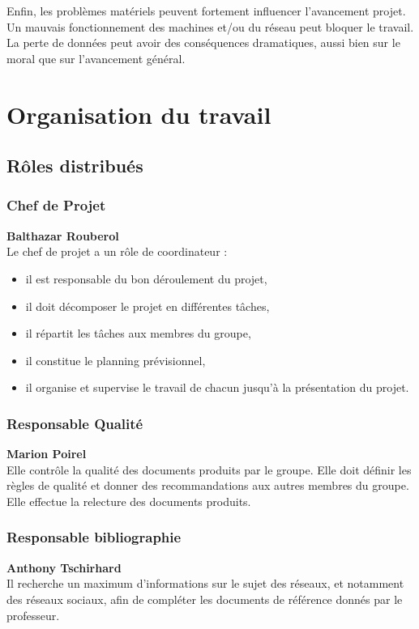 Enfin, les problèmes matériels peuvent fortement influencer l'avancement projet. Un mauvais fonctionnement des machines et/ou du réseau peut bloquer le travail. La perte de données peut avoir des conséquences dramatiques, aussi bien sur le moral que sur l'avancement général.

\section{Organisation du travail}
\subsection{Rôles distribués}

\subsubsection{Chef de Projet}
\textbf{Balthazar Rouberol}\\
Le chef de projet a un rôle de coordinateur :  
\begin{itemize}
\item il est responsable du bon déroulement du projet,
\item il doit décomposer le projet en différentes tâches,
\item il répartit les tâches aux membres du groupe,
\item il constitue le planning prévisionnel,
\item il organise et supervise le travail de chacun jusqu'à la présentation du projet.
\end{itemize}
  
\subsubsection{Responsable Qualité}
\textbf{Marion Poirel}\\
Elle contrôle la qualité des documents produits par le groupe. Elle doit définir les règles de qualité et donner des recommandations aux autres membres du groupe. Elle effectue la relecture des documents produits.

\subsubsection{Responsable bibliographie}
\textbf{Anthony Tschirhard}\\
Il recherche un maximum d'informations sur le sujet des réseaux, et notamment des réseaux sociaux, afin de compléter les documents de référence donnés par le professeur.


